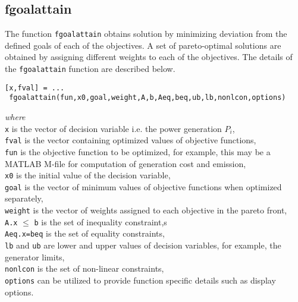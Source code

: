 \subsection*{fgoalattain}
The function \verb|fgoalattain| obtains solution by minimizing deviation from the defined goals of each of the objectives. A set of pareto-optimal solutions are obtained by assigning different weights to each of the objectives. The details of the \verb|fgoalattain| function are described below.
\begin{verbatim}
[x,fval] = ...
 fgoalattain(fun,x0,goal,weight,A,b,Aeq,beq,ub,lb,nonlcon,options)
\end{verbatim}
\textit{where } \\
\verb|x| is the vector of decision variable i.e. the power generation $P_i$, \\
\verb|fval| is the vector containing optimized values of objective functions, \\
\verb|fun| is the objective function to be optimized, for example, this may be a MATLAB M-file for computation of generation cost and emission,\\ 
\verb|x0| is the initial value of the decision variable,\\
\verb|goal| is the vector of minimum values of objective functions when optimized separately,\\
\verb|weight| is the vector of weights assigned to each objective in the pareto front,\\
\verb|A.x| $\leq$ \verb|b| is the set of inequality constraint,s\\
\verb|Aeq.x=beq| is the set of equality constraints,\\
\verb|lb| and \verb|ub| are lower and upper values of decision variables, for example, the generator limits,\\
\verb|nonlcon| is the set of non-linear constraints,\\
\verb|options| can be utilized to provide function specific details such as display options.